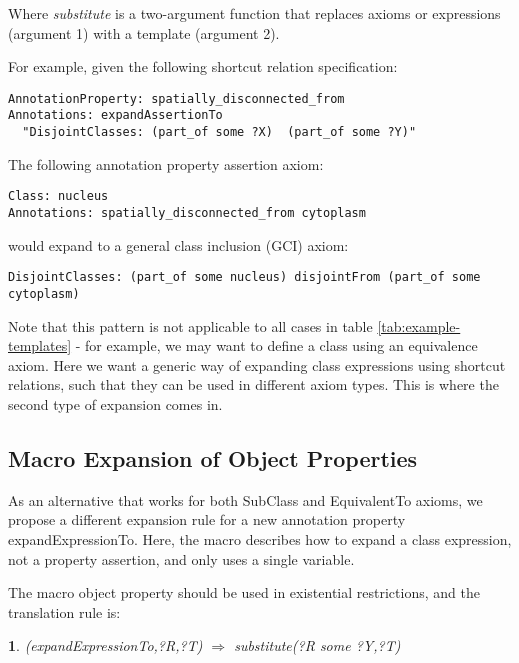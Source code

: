 \documentclass{llncs}
\newtheorem{exprule}{}[section]
\begin{document}
Where \emph{substitute} is a two-argument function that replaces
axioms or expressions (argument 1) with a template (argument 2).

For example, given the following shortcut relation specification:

\begin{verbatim}
AnnotationProperty: spatially_disconnected_from
Annotations: expandAssertionTo 
  "DisjointClasses: (part_of some ?X)  (part_of some ?Y)"
\end{verbatim}

The following annotation property assertion axiom:

\begin{verbatim}
Class: nucleus
Annotations: spatially_disconnected_from cytoplasm
\end{verbatim}

would expand to a general class inclusion (GCI) axiom:

\begin{verbatim}
DisjointClasses: (part_of some nucleus) disjointFrom (part_of some cytoplasm)
\end{verbatim}

Note that this pattern is not applicable to all cases in table
\ref{tab:example-templates} - for example, we may want to define a
class using an equivalence axiom. Here we want a generic way of
expanding class expressions using shortcut relations, such that they
can be used in different axiom types. This is where the second type of
expansion comes in.

\subsection{Macro Expansion of Object Properties}

As an alternative that works for both SubClass and EquivalentTo
axioms, we propose a different expansion rule for a new annotation
property expandExpressionTo. Here, the macro describes how to expand a class
expression, not a property assertion, and only uses a single variable.

The macro object property should be used in existential restrictions,
and the translation rule is:

\begin{exprule}\label{exp-some}
(expandExpressionTo,?R,?T)  $\Rightarrow$ \newline
substitute(?R some ?Y,?T)
\end{exprule}
\end{document}
